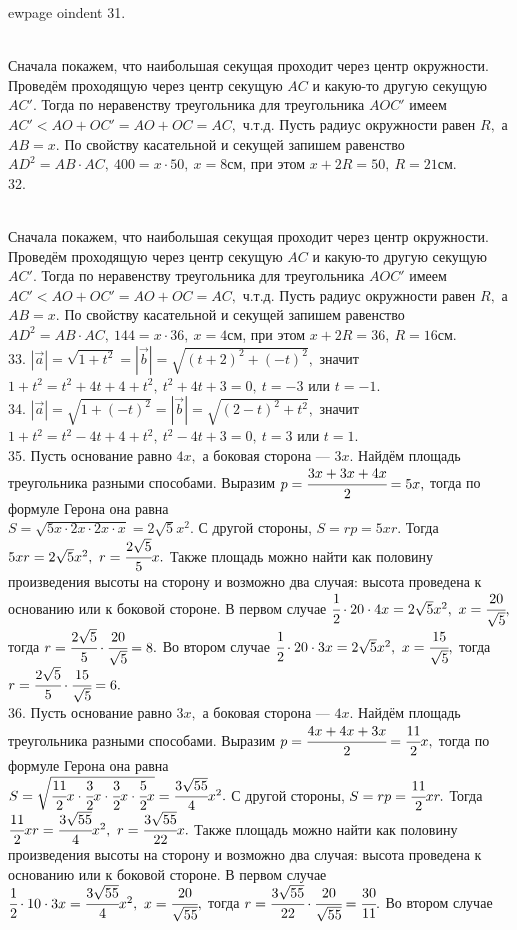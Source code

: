 ewpage
oindent
31. \begin{figure}[ht!]
\end{figure}\\
Сначала покажем, что наибольшая секущая проходит через центр окружности. Проведём проходящую через центр секущую $AC$ и какую-то другую секущую $AC'.$ Тогда по неравенству треугольника для треугольника $AOC'$ имеем $AC'<AO+OC'=AO+OC=AC,$ ч.т.д. Пусть радиус окружности равен $R,$ а $AB=x.$ По свойству касательной и секущей
запишем равенство $AD^2=AB\cdot AC,\ 400=x\cdot 50,\ x=8$см, при этом $x+2R=50,\ R=21$см.\\
32. \begin{figure}[ht!]
\end{figure}\\
Сначала покажем, что наибольшая секущая проходит через центр окружности. Проведём проходящую через центр секущую $AC$ и какую-то другую секущую $AC'.$ Тогда по неравенству треугольника для треугольника $AOC'$ имеем $AC'<AO+OC'=AO+OC=AC,$ ч.т.д. Пусть радиус окружности равен $R,$ а $AB=x.$ По свойству касательной и секущей
запишем равенство $AD^2=AB\cdot AC,\ 144=x\cdot 36,\ x=4$см, при этом $x+2R=36,\ R=16$см.\\
33. $|\vec{a}|=\sqrt{1+t^2}=|\vec{b}|=\sqrt{(t+2)^2+(-t)^2},$ значит $1+t^2=t^2+4t+4+t^2,\ t^2+4t+3=0,\ t=-3$ или $t=-1.$\\
34. $|\vec{a}|=\sqrt{1+(-t)^2}=|\vec{b}|=\sqrt{(2-t)^2+t^2},$ значит $1+t^2=t^2-4t+4+t^2,\ t^2-4t+3=0,\ t=3$ или $t=1.$\\
35. Пусть основание равно $4x,$ а боковая сторона --- $3x.$ Найдём площадь треугольника разными способами. Выразим $p=\cfrac{3x+3x+4x}{2}=5x,$ тогда по формуле Герона она равна \\$S=\sqrt{5x\cdot2x\cdot 2x\cdot x}=2\sqrt{5}x^2.$ С другой стороны, $S=rp=5xr.$ Тогда $5xr=2\sqrt{5}x^2,\ r=\cfrac{2\sqrt{5}}{5}x.$ Также площадь можно найти как половину произведения высоты на сторону и возможно два случая: высота проведена к основанию или к боковой стороне. В первом случае $\cfrac{1}{2}\cdot20\cdot4x=2\sqrt{5}x^2,\ x=\cfrac{20}{\sqrt{5}},$ тогда $r=\cfrac{2\sqrt{5}}{5}\cdot\cfrac{20}{\sqrt{5}}=8.$ Во втором случае
$\cfrac{1}{2}\cdot20\cdot3x=2\sqrt{5}x^2,\ x=\cfrac{15}{\sqrt{5}},$ тогда $r=\cfrac{2\sqrt{5}}{5}\cdot\cfrac{15}{\sqrt{5}}=6.$\\
36. Пусть основание равно $3x,$ а боковая сторона --- $4x.$ Найдём площадь треугольника разными способами. Выразим $p=\cfrac{4x+4x+3x}{2}=\cfrac{11}{2}x,$ тогда по формуле Герона она равна \\$S=\sqrt{\cfrac{11}{2}x\cdot\cfrac{3}{2}x\cdot \cfrac{3}{2}x\cdot \cfrac{5}{2}x}=\cfrac{3\sqrt{55}}{4}x^2.$ С другой стороны, $S=rp=\cfrac{11}{2}xr.$ Тогда $\cfrac{11}{2}xr=\cfrac{3\sqrt{55}}{4}x^2,\ r=\cfrac{3\sqrt{55}}{22}x.$ Также площадь можно найти как половину произведения высоты на сторону и возможно два случая: высота проведена к основанию или к боковой стороне. В первом случае $\cfrac{1}{2}\cdot10\cdot3x=\cfrac{3\sqrt{55}}{4}x^2,\ x=\cfrac{20}{\sqrt{55}},$ тогда $r=\cfrac{3\sqrt{55}}{22}\cdot\cfrac{20}{\sqrt{55}}=\cfrac{30}{11}.$ Во втором случае
